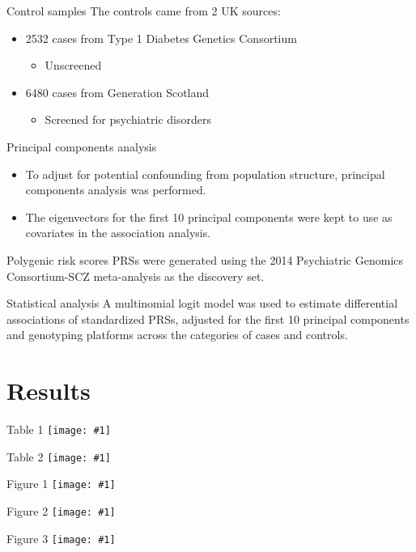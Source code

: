 \documentclass{beamer}
\newcommand*{\solo}[1]{\centering\texttt{[image: \#1]}}
\begin{document}
\begin{frame}{Control samples}
    The controls came from 2 UK sources:
    \begin{itemize}
        \item 2532 cases from Type 1 Diabetes Genetics Consortium
            \begin{itemize}
                \item Unscreened
            \end{itemize}
        \item 6480 cases from Generation Scotland
            \begin{itemize}
                \item Screened for psychiatric disorders
            \end{itemize}
    \end{itemize}
\end{frame}

\begin{frame}{Principal components analysis}
    \begin{itemize}
        \item To adjust for potential confounding from population structure, principal components analysis was performed.
        \item The eigenvectors for the first 10 principal components were kept to use as covariates in the association analysis.
    \end{itemize}
\end{frame}

\begin{frame}{Polygenic risk scores}
    PRSs were generated using the 2014 Psychiatric Genomics Consortium-SCZ
    meta-analysis as the discovery set.
\end{frame}

\begin{frame}{Statistical analysis}
    A multinomial logit model was used to estimate differential associations of
    standardized PRSs, adjusted for the first 10 principal components and
    genotyping platforms across the categories of cases and controls.
\end{frame}

\section{Results}
\begin{frame}{Table 1}
    \solo{T1.eps}
\end{frame}

\begin{frame}{Table 2}
    \solo{T2.eps}
\end{frame}

\begin{frame}{Figure 1}
    \solo{F1.eps}
\end{frame}

\begin{frame}{Figure 2}
    \solo{F2.eps}
\end{frame}

\begin{frame}{Figure 3}
    \solo{F3.eps}
\end{frame}
\end{document}
